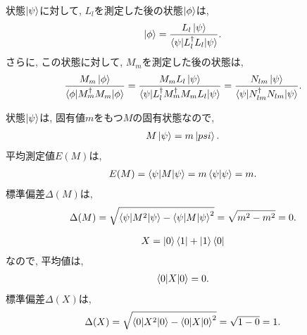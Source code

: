 \begin{ex}
    \label{ex2.57}
    状態$\ket{\psi}$に対して, $L_l$を測定した後の状態$\ket{\phi}$は,
    \begin{align*}
        \ket{\phi} = \frac{L_l \ket{\psi}}{\braket{\psi|L_l^\dagger L_l| \psi}}.
    \end{align*}
    さらに, この状態に対して, $M_m$を測定した後の状態は,
    \begin{align*}
        \frac{M_m \ket{\phi}}{\braket{\phi|M_m^\dagger M_m| \phi}}
        =
        \frac{M_m L_l \ket{\psi}}{\braket{\psi| L_l^\dagger M_m^\dagger M_m L_l| \psi}}
        =
        \frac{N_{lm} \ket{\psi}}{\braket{\psi|  N_{lm}^\dagger N_{lm}| \psi}}.
    \end{align*}
\end{ex}

\begin{ex}
    \label{ex2.58}
    状態$\ket{\psi}$は, 固有値$m$をもつ$M$の固有状態なので,
    \begin{align*}
        M \ket{\psi} = m \ket{psi}.
    \end{align*}
    平均測定値$E(M)$は,
    \begin{align*}
        E(M) = \braket{\psi| M |\psi} = m \braket{\psi | \psi} = m.
    \end{align*}
    標準偏差$\Delta(M)$は,
    \begin{align*}
        \Delta(M) = \sqrt{\braket{\psi| M^2 |\psi} - \braket{\psi| M |\psi}^2} = \sqrt{m^2 - m^2} = 0.
    \end{align*}
\end{ex}

\begin{ex}
    \label{ex2.59}
    \begin{align*}
        X = \ket{0}\bra{1} + \ket{1}\bra{0}
    \end{align*}
    なので,
    平均値は,
    \begin{align*}
        \braket{0|X|0} = 0.
    \end{align*}
    標準偏差$\Delta(X)$は,
    \begin{align*}
        \Delta(X)
        = \sqrt{\braket{0| X^2 |0} - \braket{0| X |0}^2}
        = \sqrt{1 - 0}
        = 1.
    \end{align*}
\end{ex}

